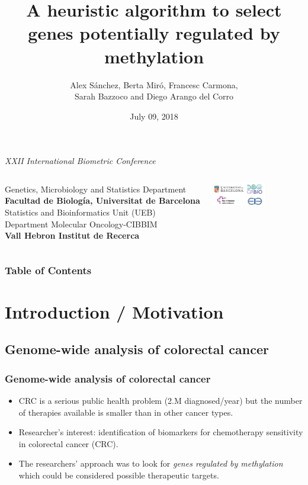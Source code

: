 \documentclass[handout]{beamer}
\title[L-Shape Selection]{A heuristic algorithm to select genes potentially regulated by methylation}
\author[Alex S\'anchez]{Alex S\'anchez, Berta Mir\'o, Francesc Carmona, \\
	Sarah Bazzoco and Diego Arango del Corro}
\date[]{July 09, 2018}
\begin{document}
\begin{frame}
	
\begin{scriptsize}
\begin{center}
  \emph{ XXII International Biometric Conference}
\end{center}
\end{scriptsize}

\titlepage

\begin{columns}
   \scriptsize
   Genetics, Microbiology and Statistics Department \\ 
   \textbf{Facultad de Biología, Universitat de Barcelona}\\
   Statistics and Bioinformatics Unit (UEB)\\
   Department Molecular Oncology-CIBBIM \\ 
   \textbf{Vall Hebron Institut de Recerca}

  \hfill{}
  \includegraphics[height=1cm]{images/alllogos.png}
\end{columns}

\end{frame}


\begin{frame}
\frametitle{Table of Contents}
\tableofcontents
\end{frame}

\section{Introduction / Motivation}

\subsection{Genome-wide analysis of colorectal cancer}

\begin{frame}
	\frametitle{Genome-wide analysis of colorectal cancer}
	  \begin{itemize}
	  	\item CRC is a serious public health problem (2.M diagnosed/year) but the number of therapies available is smaller than in other cancer types.
	  	\item Researcher's interest: identification of biomarkers for chemotherapy sensitivity in colorectal cancer (CRC).
	  	\item The researchers' approach was to look for \textit{genes regulated by methylation} which could be considered possible therapeutic targets.
	  	\end{itemize}
\end{frame}
\end{document}
